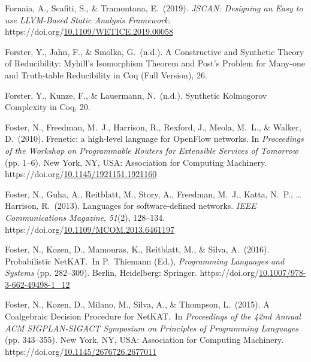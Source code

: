 \documentclass[12pt,twoside]{article}
\begin{document}
{\begin{thebibliography}{1079}
\mdbibitemlabel{}Fornaia, A., Scafiti, S., \& Tramontana, E.~(2019). \emph{JSCAN: Designing an Easy to use LLVM-Based Static Analysis Framework}. https://doi.org/\href{https://dx.doi.org/10.1109/WETICE.2019.00058}{10.1109/WETICE.2019.00058}%

\mdbibitemlabel{}Forster, Y., Jahn, F., \& Smolka, G.~(n.d.). A Constructive and Synthetic Theory of Reducibility: Myhill’s Isomorphism Theorem and Post's Problem for Many-one and Truth-table Reducibility in Coq (Full Version), 26.%

\mdbibitemlabel{}Forster, Y., Kunze, F., \& Lauermann, N.~(n.d.). Synthetic Kolmogorov Complexity in Coq, 20.%

\mdbibitemlabel{}Foster, N., Freedman, M.~J., Harrison, R., Rexford, J., Meola, M.~L., \& Walker, D.~(2010). Frenetic: a high-level language for OpenFlow networks. In \emph{Proceedings of the Workshop on Programmable Routers for Extensible Services of Tomorrow} (pp. 1–6). New York, NY, USA: Association for Computing Machinery. https://doi.org/\href{https://dx.doi.org/10.1145/1921151.1921160}{10.1145/1921151.1921160}%

\mdbibitemlabel{}Foster, N., Guha, A., Reitblatt, M., Story, A., Freedman, M.~J., Katta, N.~P., … Harrison, R.~(2013). Languages for software-defined networks. \emph{IEEE Communications Magazine}, \emph{51}(2), 128–134. https://doi.org/\href{https://dx.doi.org/10.1109/MCOM.2013.6461197}{10.1109/MCOM.2013.6461197}%

\mdbibitemlabel{}Foster, N., Kozen, D., Mamouras, K., Reitblatt, M., \& Silva, A.~(2016). Probabilistic NetKAT.~In P.~Thiemann (Ed.), \emph{Programming Languages and Systems} (pp. 282–309). Berlin, Heidelberg: Springer. https://doi.org/\href{https://dx.doi.org/10.1007/978-3-662-49498-1_12}{10.1007/978-3-662-49498-1\_12}%

\mdbibitemlabel{}Foster, N., Kozen, D., Milano, M., Silva, A., \& Thompson, L.~(2015). A Coalgebraic Decision Procedure for NetKAT.~In \emph{Proceedings of the 42nd Annual ACM SIGPLAN-SIGACT Symposium on Principles of Programming Languages} (pp. 343–355). New York, NY, USA: Association for Computing Machinery. https://doi.org/\href{https://dx.doi.org/10.1145/2676726.2677011}{10.1145/2676726.2677011}%


\end{thebibliography}}
\end{document}
